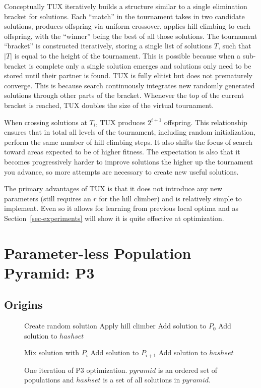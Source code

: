 \documentclass{sig-alternate}
\begin{document}
Conceptually TUX iteratively builds a structure similar to a single elimination
bracket for solutions. Each ``match'' in the tournament takes in two candidate solutions,
produces offspring via uniform crossover, applies hill climbing to each offspring, with
the ``winner'' being the best of all those solutions. The tournament ``bracket'' is constructed
iteratively, storing a single list of solutions $T$, such that $|T|$ is equal to the height
of the tournament. This is possible because when a sub-bracket is complete only a single solution
emerges and solutions only need to be stored until their partner is found.
TUX is fully elitist but does not prematurely converge. This is because search continuously
integrates new randomly generated solutions through other parts of the bracket. Whenever the
top of the current bracket is reached, TUX doubles the size of the virtual tournament.

When crossing solutions at $T_i$, TUX produces $2^{i+1}$ offspring. This relationship
ensures that in total all levels of the tournament, including random initialization,
perform the same number of hill climbing steps. It also shifts the focus of search toward
areas expected to be of higher fitness. The expectation is also that it becomes progressively
harder to improve solutions the higher up the tournament you advance, so more attempts
are necessary to create new useful solutions.

The primary advantages of TUX is that it does not introduce any new parameters (still
requires an $r$ for the hill climber) and is relatively simple to implement. Even so
it allows for learning from previous local optima and as Section~\ref{sec-experiments}
will show it is quite effective at optimization.

\section{Parameter-less Population Pyramid: P3}
\subsection{Origins}
\begin{figure}
  \begin{algorithmic}
    \State Create random solution
    \State Apply hill climber
      \State Add solution to $P_0$
      \State Add solution to $hashset$
    \EndIf

      \State Mix solution with $P_i$
          \State Add solution to $P_{i+1}$
          \State Add solution to $hashset$
        \EndIf
      \EndIf
    \EndFor
  \EndProcedure
\end{algorithmic}
  \caption{One iteration of P3 optimization. $pyramid$ is an
           ordered set of populations and $hashset$ is a set
           of all solutions in $pyramid$.}
  \label{fig-p3}
\end{figure}
\end{document}
